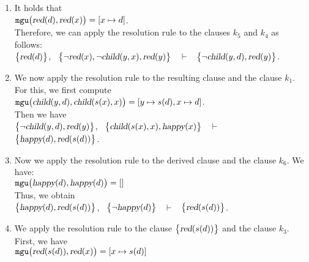 \begin{enumerate}
\item It holds that
      \\[0.2cm]
      \hspace*{1.3cm}
      $\mathtt{mgu}\bigl(\textsl{red}(d), \textsl{red}(x)\bigr) = [x \mapsto d]$.
      \\[0.2cm]
      Therefore, we can apply the resolution rule to the clauses $k_5$ and $k_4$ as follows:
      \\[0.2cm]
      \hspace*{1.3cm}
      $\bigl\{\textsl{red}(d)\bigl\}$, \ $\bigl\{\neg \textsl{red}(x), \neg \textsl{child}(y,x), \textsl{red}(y)\bigl\}$ \ $\vdash$ \ $\bigl\{\neg \textsl{child}(y,d), \textsl{red}(y)\bigl\}$.
\item We now apply the resolution rule to the resulting clause and the clause $k_1$. For this, we first compute
      \\[0.2cm]
      \hspace*{1.3cm}
      $\mathtt{mgu}\bigl(\textsl{child}(y,d), \textsl{child}(s(x),x)\bigr) = 
       [y \mapsto s(d), x \mapsto d]$.
      \\[0.2cm]
      Then we have
      \\[0.2cm]
      \hspace*{1.3cm}
       $\bigl\{\neg \textsl{child}(y,d), \textsl{red}(y)\bigl\}$, \ 
       $\bigl\{\textsl{child}(s(x),x), \textsl{happy}(x)\bigl\}$ \ $\vdash$ \ 
       $\bigl\{\textsl{happy}(d), \textsl{red}(s(d))\bigl\}$.
\item Now we apply the resolution rule to the derived clause and the clause $k_6$. We have:
      \\[0.2cm]
      \hspace*{1.3cm}
      $\mathtt{mgu}\bigl(\textsl{happy}(d), \textsl{happy}(d)\bigr) = []$
      \\[0.2cm]
      Thus, we obtain
      \\[0.2cm]
      \hspace*{1.3cm}
      $\bigl\{\textsl{happy}(d), \textsl{red}(s(d))\bigl\}$, \ $\bigl\{\neg \textsl{happy}(d)\bigl\}$ \ $\vdash$ \ $\bigl\{\textsl{red}(s(d))\bigl\}$.
\item We apply the resolution rule to the clause $\bigl\{\textsl{red}(s(d))\bigl\}$ and the clause $k_3$. First, we have
      \\[0.2cm]
      \hspace*{1.3cm}
      $\mathtt{mgu}\bigl(\textsl{red}(s(d)), \textsl{red}(x)\bigr) = [x \mapsto s(d)]$

\end{enumerate}
